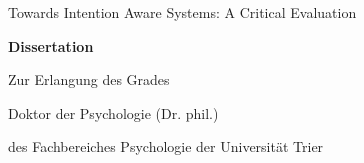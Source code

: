 \documentclass[11pt, a4paper, titlepage]{book}
\begin{document}
\sloppy

%


\frontmatter

\begin{titlepage}
   \begin{center} 
      \Large Towards Intention Aware Systems: A Critical Evaluation             
    \end{center}
    \vspace{15ex}
    \begin{center} 
     \large \textbf{Dissertation}
    \end{center}
    \vspace{5ex}
    \begin{center} 
        Zur Erlangung des Grades
    \end{center}
    \begin{center} 
        Doktor der Psychologie (Dr. phil.)
    \end{center}
    \vspace{5ex}
    \begin{center} 
        des Fachbereiches Psychologie der Universität Trier
    \end{center}
    
\strut
\end{titlepage}

%

%

\tableofcontents
%
%

%

%

%
\end{document}
